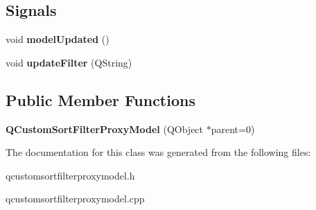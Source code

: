 \subsection*{Signals}
\begin{DoxyCompactItemize}
\item 
\mbox{\label{class_q_custom_sort_filter_proxy_model_a5032cbe24943fa9956d35148a65d0c89}} 
void {\bfseries model\+Updated} ()
\item 
\mbox{\label{class_q_custom_sort_filter_proxy_model_a2449bf876853e7dcfc22a224873a8822}} 
void {\bfseries update\+Filter} (Q\+String)
\end{DoxyCompactItemize}
\subsection*{Public Member Functions}
\begin{DoxyCompactItemize}
\item 
\mbox{\label{class_q_custom_sort_filter_proxy_model_aa51b6a64ce00d57682fa21baa5c62f9e}} 
{\bfseries Q\+Custom\+Sort\+Filter\+Proxy\+Model} (Q\+Object $\ast$parent=0)
\end{DoxyCompactItemize}


The documentation for this class was generated from the following files\+:\begin{DoxyCompactItemize}
\item 
qcustomsortfilterproxymodel.\+h\item 
qcustomsortfilterproxymodel.\+cpp\end{DoxyCompactItemize}
